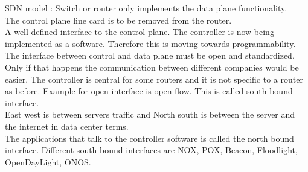 \documentclass[solution,addpoints,12pt]{exam}
\begin{document}
SDN model : Switch or router only implements the data plane functionality.\\
The control plane line card is to be removed from the router.\\
A well defined interface to the control plane. The controller
is now being implemented as a software. Therefore this is moving towards
programmability. The interface between control and data plane must be
open and standardized. Only if that happens the communication between
different companies would be easier. The controller is central for
some routers and it is not specific to a router as before. Example for
open interface is open flow. This is called south bound interface.\\

East west is between servers traffic and North south is between the server
and the internet in data center terms.\\

The applications that talk to the controller software is called the
north bound interface. Different south bound interfaces are NOX,
POX, Beacon, Floodlight, OpenDayLight, ONOS.
\end{document}

